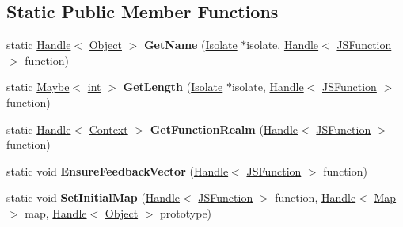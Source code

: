 \subsection*{Static Public Member Functions}
\begin{DoxyCompactItemize}
\item 
\mbox{\label{classv8_1_1internal_1_1JSFunction_a88a67b0552607343a1fa19b81ae62d67}} 
static \mbox{\hyperlink{classv8_1_1internal_1_1Handle}{Handle}}$<$ \mbox{\hyperlink{classv8_1_1internal_1_1Object}{Object}} $>$ {\bfseries Get\+Name} (\mbox{\hyperlink{classv8_1_1internal_1_1Isolate}{Isolate}} $\ast$isolate, \mbox{\hyperlink{classv8_1_1internal_1_1Handle}{Handle}}$<$ \mbox{\hyperlink{classv8_1_1internal_1_1JSFunction}{J\+S\+Function}} $>$ function)
\item 
\mbox{\label{classv8_1_1internal_1_1JSFunction_a48c99d74dc10d7618cb0dd3c4a3a5396}} 
static \mbox{\hyperlink{classv8_1_1Maybe}{Maybe}}$<$ \mbox{\hyperlink{classint}{int}} $>$ {\bfseries Get\+Length} (\mbox{\hyperlink{classv8_1_1internal_1_1Isolate}{Isolate}} $\ast$isolate, \mbox{\hyperlink{classv8_1_1internal_1_1Handle}{Handle}}$<$ \mbox{\hyperlink{classv8_1_1internal_1_1JSFunction}{J\+S\+Function}} $>$ function)
\item 
\mbox{\label{classv8_1_1internal_1_1JSFunction_a00978787d2a2af4763b32809cd5817db}} 
static \mbox{\hyperlink{classv8_1_1internal_1_1Handle}{Handle}}$<$ \mbox{\hyperlink{classv8_1_1internal_1_1Context}{Context}} $>$ {\bfseries Get\+Function\+Realm} (\mbox{\hyperlink{classv8_1_1internal_1_1Handle}{Handle}}$<$ \mbox{\hyperlink{classv8_1_1internal_1_1JSFunction}{J\+S\+Function}} $>$ function)
\item 
\mbox{\label{classv8_1_1internal_1_1JSFunction_a975b51fdbacab6d5e916c461af7de574}} 
static void {\bfseries Ensure\+Feedback\+Vector} (\mbox{\hyperlink{classv8_1_1internal_1_1Handle}{Handle}}$<$ \mbox{\hyperlink{classv8_1_1internal_1_1JSFunction}{J\+S\+Function}} $>$ function)
\item 
\mbox{\label{classv8_1_1internal_1_1JSFunction_a48718f059b10957861aaecf82963da22}} 
static void {\bfseries Set\+Initial\+Map} (\mbox{\hyperlink{classv8_1_1internal_1_1Handle}{Handle}}$<$ \mbox{\hyperlink{classv8_1_1internal_1_1JSFunction}{J\+S\+Function}} $>$ function, \mbox{\hyperlink{classv8_1_1internal_1_1Handle}{Handle}}$<$ \mbox{\hyperlink{classv8_1_1internal_1_1Map}{Map}} $>$ map, \mbox{\hyperlink{classv8_1_1internal_1_1Handle}{Handle}}$<$ \mbox{\hyperlink{classv8_1_1internal_1_1Object}{Object}} $>$ prototype)

\end{DoxyCompactItemize}
